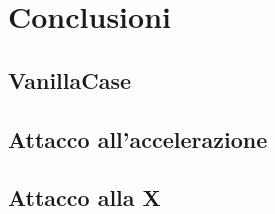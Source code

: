 \section{Conclusioni}
\subsection{VanillaCase}
\subsection{Attacco all'accelerazione}
\subsection{Attacco alla X}